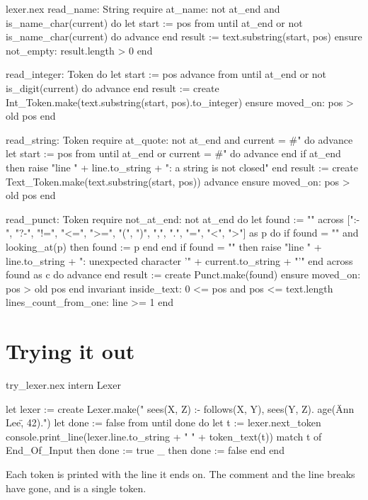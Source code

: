\begin{continued}{lexer.nex}
  read_name: String
  require
    at_name: not at_end and is_name_char(current)
  do
    let start := pos
    from until at_end or not is_name_char(current) do
      advance
    end
    result := text.substring(start, pos)
  ensure
    not_empty: result.length > 0
  end

  read_integer: Token
  do
    let start := pos
    advance
    from until at_end or not is_digit(current) do
      advance
    end
    result := create Int_Token.make(text.substring(start, pos).to_integer)
  ensure
    moved_on: pos > old pos
  end

  read_string: Token
  require
    at_quote: not at_end and current = #"
  do
    advance
    let start := pos
    from until at_end or current = #" do
      advance
    end
    if at_end then
      raise "line " + line.to_string + ": a string is not closed"
    end
    result := create Text_Token.make(text.substring(start, pos))
    advance
  ensure
    moved_on: pos > old pos
  end

  read_punct: Token
  require
    not_at_end: not at_end
  do
    let found := ""
    across [":-", "?-", "!=", "<=", ">=", "(", ")", ",", ".", "=", "<", ">"] as p do
      if found = "" and looking_at(p) then
        found := p
      end
    end
    if found = "" then
      raise "line " + line.to_string + ": unexpected character '" + current.to_string + "'"
    end
    across found as c do
      advance
    end
    result := create Punct.make(found)
  ensure
    moved_on: pos > old pos
  end
invariant
  inside_text: 0 <= pos and pos <= text.length
  lines_count_from_one: line >= 1
end
\end{continued}

\section{Trying it out}

\begin{tryit}{try_lexer.nex}
intern Lexer

let lexer := create Lexer.make("%
sees(X, Z) :- follows(X, Y), sees(Y, Z).
age(\"Ann Lee\", 42).")
let done := false
from until done do
  let t := lexer.next_token
  console.print_line(lexer.line.to_string + "  " + token_text(t))
  match t of
    End_Of_Input then done := true
    _            then done := false
  end
end
\end{tryit}

Each token is printed with the line it ends on. The comment and the line
breaks have gone, and \code{:-} is a single token.
